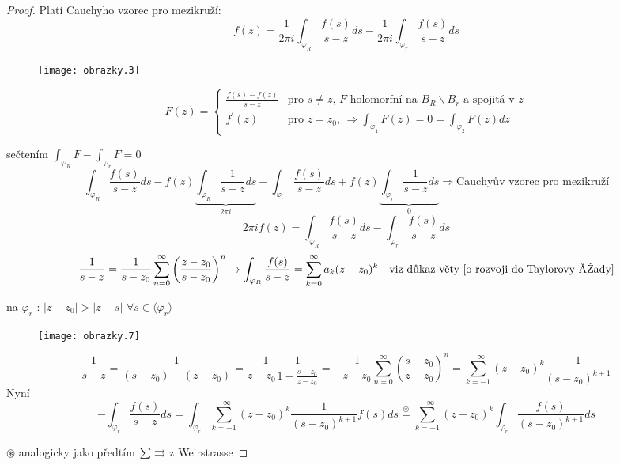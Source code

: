\begin{proof}
Platí Cauchyho vzorec pro mezikruží:
$$f(z) = \frac{1}{2 \pi i} \int_{\varphi_R} \frac{f(s)}{s-z} ds - \frac{1}{2 \pi i} \int_{\varphi_r} \frac{f(s)}{s-z} ds$$

\begin{figure}[!h] \begin{center}
\texttt{[image: obrazky.3]}
\end{center} \end{figure}

\begin{equation*}
F(z) = \left\{ \begin{array}{ll}
 \frac{f(s)-f(z)}{s-z} & \textrm{pro $s \neq z$, $F$ holomorfní na $B_R \backslash B_r$ a spojitá v $z$} \\
 f^\prime(z) & \textrm{pro $z=z_0$, $\Rightarrow \int_{\varphi_1} F(z) = 0 = \int_{\varphi_2} F(z) dz$}
  \end{array} \right.
\end{equation*}

sečtením $\int_{\varphi_R} F - \int_{\varphi_r} F = 0$
$$\int_{\varphi_R} \frac{f(s)}{s-z} ds - f(z) \underbrace{\int_{\varphi_R} \frac{1}{s-z} ds}_{2 \pi i} - \int_{\varphi_r} \frac{f(s)}{s-z} ds + f(z) \underbrace{\int_{\varphi_r} \frac{1}{s-z} ds}_{0} \Rightarrow \textrm{Cauchyův vzorec pro mezikruží}$$
$$2 \pi i f(z) = \int_{\varphi_R} \frac{f(s)}{s-z} ds - \int_{\varphi_r} \frac{f(s)}{s-z} ds$$
$$\frac{1}{s-z} = \frac{1}{s-z_0} \sum_{n=0}^\infty \left( \frac{z-z_0}{s-z_0} \right)^n \to \int_{\varphi_R} \frac{f(s)}{s-z} = \sum_{k=0}^\infty a_k (z-z_0)^k \quad \textrm{viz důkaz věty \ref{o rozvoji do Taylorovy řady}}$$

na $\varphi_r$ : $|z-z_0| > |z-s|$ $\forall s \in \langle \varphi_r \rangle$
\begin{figure}[!h] \begin{center}
\texttt{[image: obrazky.7]}
\end{center} \end{figure}
$$\frac{1}{s-z} = \frac{1}{(s-z_0)-(z-z_0)} = \frac{-1}{z-z_0} \frac{1}{1 - \frac{s-z_0}{z-z_0}} = - \frac{1}{z-z_0} \sum_{n=0}^\infty \left( \frac{s-z_0}{z-z_0} \right)^n = \sum_{k=-1}^{-\infty} (z-z_0)^k \frac{1}{(s-z_0)^{k+1}}$$
Nyní
$$- \int_{\varphi_r} \frac{f(s)}{s-z} ds = \int_{\varphi_r} \sum_{k=-1}^{-\infty} (z-z_0)^k \frac{1}{(s-z_0)^{k+1}} f(s) ds \overset{\circledast}{=} \sum_{k=-1}^{-\infty} (z-z_0)^{k} \int_{\varphi_r} \frac{f(s)}{(s-z_0)^{k+1}} ds$$

$\circledast$ analogicky jako předtím $\sum \rightrightarrows$ z Weirstrasse
\end{proof}
